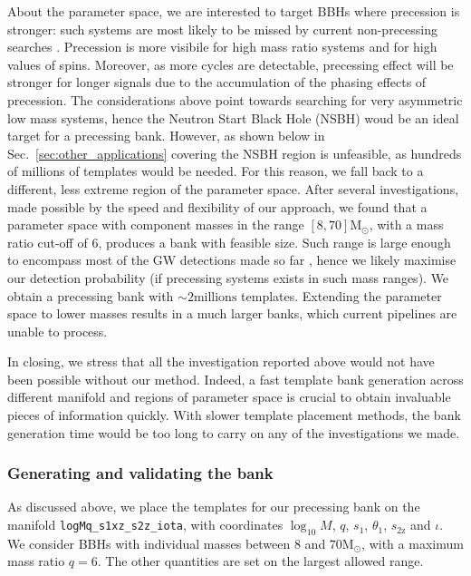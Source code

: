 \documentclass[twocolumn,showpacs,preprintnumbers,nofootinbib,prd,
superscriptaddress,10pt]{revtex4-2}
\begin{document}
About the parameter space, we are interested to target BBHs where precession is stronger: such systems are most likely to be missed by current non-precessing searches \cite{}.
Precession is more visibile for high mass ratio systems and for high values of spins. Moreover, as more cycles are detectable, precessing effect will be stronger for longer signals due to the accumulation of the phasing effects of precession.
The considerations above point towards searching for very asymmetric low mass systems, hence the Neutron Start Black Hole (NSBH) woud be an ideal target for a precessing bank. However, as shown below in Sec.~\ref{sec:other_applications} covering the NSBH region is unfeasible, as hundreds of millions of templates would be needed.
For this reason, we fall back to a different, less extreme region of the parameter space. After several investigations, made possible by the speed and flexibility of our approach, we found that a parameter space with component masses in the range $[8, 70] \mathrm{M_\odot}$, with a mass ratio cut-off of $6$, produces a bank with feasible size.
Such range is large enough to encompass most of the GW detections made so far \cite{LIGOScientific:2020kqk, KAGRA:2021duu}, hence we likely maximise our detection probability (if precessing systems exists in such mass ranges).
We obtain a precessing bank with $\sim 2 \text{millions}$ templates. Extending the parameter space to lower masses results in a much larger banks, which current pipelines are unable to process.

In closing, we stress that all the investigation reported above would not have been possible without our method. Indeed, a fast template bank generation across different manifold and regions of parameter space is crucial to obtain invaluable pieces of information quickly. With slower template placement methods, the bank generation time would be too long to carry on any of the investigations we made.

\subsubsection{Generating and validating the bank}

As discussed above, we place the templates for our precessing bank on the manifold \texttt{logMq\_s1xz\_s2z\_iota}, with coordinates $\log_{10}M$, $q$, $s_\text{1}$, $\theta_\text{1}$, $s_\text{2z}$ and $\iota$.
We consider BBHs with individual masses between  $8$ and $70 \mathrm{M_\odot}$, with a maximum mass ratio $q = 6$.
The other quantities are set on the largest allowed range.
\end{document}
